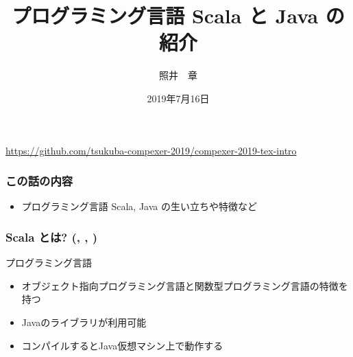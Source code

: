 \documentclass[dvipdfmx]{beamer}
\title{プログラミング言語 Scala と Java の紹介}
\author{照井　章}
\institute{筑波大学 数理物質系}
\date{2019年7月16日}
\begin{document}
    
\begin{frame}
    \frametitle{}
    \titlepage

    \begin{center}
        \url{https://github.com/tsukuba-compexer-2019/compexer-2019-tex-intro}
    \end{center}
\end{frame}

\begin{frame}
    \frametitle{この話の内容}
    \large
    \begin{itemize}
        \item プログラミング言語 Scala, Java の生い立ちや特徴など
    \end{itemize}
\end{frame}

\begin{frame}
    \frametitle{Scala とは? (\cite{scala-3}, \cite{scala-3-jp}, \cite{scala})}

    \begin{block}{プログラミング言語}
        \begin{itemize}
            \item オブジェクト指向プログラミング言語と関数型プログラミング言語の特徴を持つ
            \item Javaのライブラリが利用可能
            \item コンパイルするとJava仮想マシン上で動作する
        \end{itemize}
    \end{block}
\end{frame}
\end{document}

